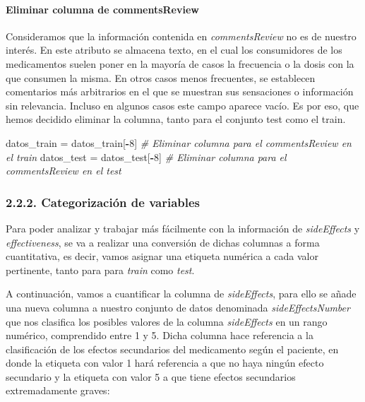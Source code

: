 \documentclass[spanish,]{article}
\newenvironment{Shaded}{\begin{snugshade}}{\end{snugshade}}
\newcommand{\DecValTok}[1]{\textcolor[rgb]{0.00,0.00,0.81}{#1}}
\newcommand{\StringTok}[1]{\textcolor[rgb]{0.31,0.60,0.02}{#1}}
\newcommand{\CommentTok}[1]{\textcolor[rgb]{0.56,0.35,0.01}{\textit{#1}}}
\newcommand{\OperatorTok}[1]{\textcolor[rgb]{0.81,0.36,0.00}{\textbf{#1}}}
\newcommand{\NormalTok}[1]{#1}
\let\oldparagraph\paragraph
\renewcommand{\paragraph}[1]{\oldparagraph{#1}\mbox{}}
\begin{document}
\paragraph{Eliminar columna de
commentsReview}\label{eliminar-columna-de-commentsreview}

Consideramos que la información contenida en \emph{commentsReview} no es
de nuestro interés. En este atributo se almacena texto, en el cual los
consumidores de los medicamentos suelen poner en la mayoría de casos la
frecuencia o la dosis con la que consumen la misma. En otros casos menos
frecuentes, se establecen comentarios más arbitrarios en el que se
muestran sus sensaciones o información sin relevancia. Incluso en
algunos casos este campo aparece vacío. Es por eso, que hemos decidido
eliminar la columna, tanto para el conjunto test como el train.

\begin{Shaded}
\begin{Highlighting}[]
\NormalTok{datos_train =}\StringTok{ }\NormalTok{datos_train[}\OperatorTok{-}\DecValTok{8}\NormalTok{] }\CommentTok{# Eliminar columna para el commentsReview en el train}
\NormalTok{datos_test =}\StringTok{ }\NormalTok{datos_test[}\OperatorTok{-}\DecValTok{8}\NormalTok{] }\CommentTok{# Eliminar columna para el commentsReview en el test}
\end{Highlighting}
\end{Shaded}

\subsubsection{2.2.2. Categorización de
variables}\label{categorizacion-de-variables}

Para poder analizar y trabajar más fácilmente con la información de
\emph{sideEffects} y \emph{effectiveness}, se va a realizar una
conversión de dichas columnas a forma cuantitativa, es decir, vamos
asignar una etiqueta numérica a cada valor pertinente, tanto para para
\emph{train} como \emph{test}.

A continuación, vamos a cuantificar la columna de \emph{sideEffects},
para ello se añade una nueva columna a nuestro conjunto de datos
denominada \emph{sideEffectsNumber} que nos clasifica los posibles
valores de la columna \emph{sideEffects} en un rango numérico,
comprendido entre 1 y 5. Dicha columna hace referencia a la
clasificación de los efectos secundarios del medicamento según el
paciente, en donde la etiqueta con valor 1 hará referencia a que no haya
ningún efecto secundario y la etiqueta con valor 5 a que tiene efectos
secundarios extremadamente graves:
\end{document}
